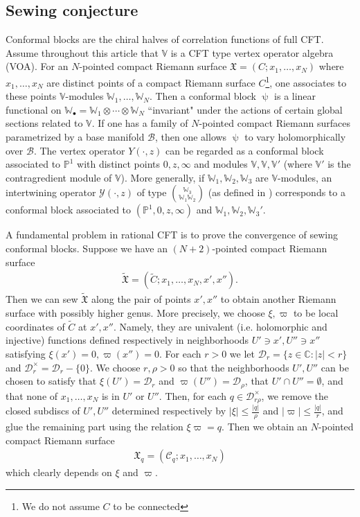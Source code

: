 \documentclass[12pt,a4paper,notitlepage]{article}
\theoremstyle{definition}
\theoremstyle{plain}
\newcommand{\fk}{\mathfrak}
\newcommand{\mc}{\mathcal}
\newcommand{\wtd}{\widetilde}
\newcommand{\blt}{\bullet}
\newcommand{\Vbb}{\mathbb V}
\newcommand{\Wbb}{\mathbb W}
\newcommand{\Cbb}{\mathbb C}
\newcommand{\Pbb}{\mathbb P}
\numberwithin{equation}{section}
\begin{document}
\subsection*{Sewing conjecture}



Conformal blocks are the chiral halves of correlation functions of full CFT. Assume throughout this article that $\Vbb$ is a CFT type vertex operator algebra (VOA). For an $N$-pointed  compact Riemann surface $\fk X=(C;x_1,\dots,x_N)$ where  $x_1,\dots,x_N$ are distinct points of a compact Riemann surface $C$\footnote{We do not assume $C$ to be connected},  one associates to these points $\Vbb$-modules $\Wbb_1,\dots,\Wbb_N$. Then a conformal block $\uppsi$ is a  linear functional on $\Wbb_\blt=\Wbb_1\otimes\cdots\otimes\Wbb_N$ ``invariant" under the actions of certain global sections  related to $\Vbb$. If one has a family of $N$-pointed compact Riemann surfaces parametrized by a base manifold $\mc B$, then one allows $\uppsi$ to vary holomorphically over $\mc B$. The vertex operator $Y(\cdot,z)$ can be regarded as a conformal block associated to $\Pbb^1$ with distinct points $0,z,\infty$ and modules $\Vbb,\Vbb,\Vbb'$ (where $\Vbb'$ is the contragredient module of $\Vbb$). More generally, if $\Wbb_1,\Wbb_2,\Wbb_3$ are $\Vbb$-modules, an intertwining operator $\mc Y(\cdot,z)$ of type $\Wbb_3\choose\Wbb_1\Wbb_2$ (as defined in \cite{FHL93}) corresponds to a conformal block associated to $(\Pbb^1,0,z,\infty)$ and $\Wbb_1,\Wbb_2,\Wbb_3'$.

A fundamental problem in rational CFT is to prove the convergence of sewing conformal blocks.  Suppose  we have an $(N+2)$-pointed compact Riemann surface
\begin{align*}
\wtd{\fk X}=(\wtd C;x_1,\dots,x_N,x',x'').
\end{align*}
Then we can sew $\wtd{\fk X}$ along the pair of points $x',x''$ to obtain another Riemann surface with possibly higher genus. More precisely, we choose $\xi,\varpi$ to be local coordinates of $\wtd C$ at $x',x''$. Namely, they are univalent  (i.e. holomorphic and injective) functions defined respectively in neighborhoods $U'\ni x',U''\ni x''$ satisfying $\xi(x')=0,\varpi(x'')=0$. For each $r>0$ we let $\mc D_r=\{z\in\Cbb:|z|<r\}$ and $\mc D_r^\times=\mc D_r-\{0\}$. We choose $r,\rho>0$ so that the neighborhoods $U',U''$ can be chosen to satisfy that $\xi(U')=\mc D_r$ and $\varpi(U'')=\mc D_\rho$, that  $U'\cap U''=\emptyset$, and that none of $x_1,\dots,x_N$ is in $U'$ or $U''$. Then, for each $q\in\mc D_{r\rho}^\times$, we remove the closed subdiscs of $U',U''$ determined respectively by $|\xi|\leq \frac {|q|}\rho$ and $|\varpi|\leq \frac{|q|}r$, and glue the remaining part using the relation $\xi\varpi=q$. Then we obtain an $N$-pointed compact Riemann surface
\begin{align*}
\fk X_q=(\mc C_q;x_1,\dots,x_N)
\end{align*}
which clearly depends on $\xi$ and $\varpi$.
\end{document}
